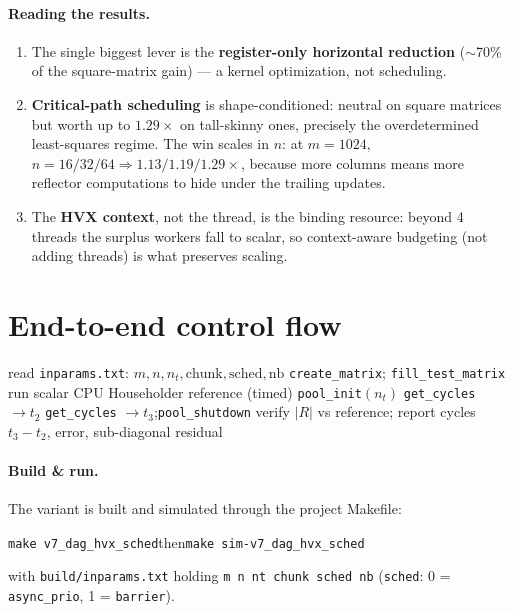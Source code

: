 \documentclass[11pt]{article}
\newcommand{\code}[1]{\texttt{\small #1}}
\begin{document}
\paragraph{Reading the results.}
\begin{enumerate}\itemsep1pt
\item The single biggest lever is the \textbf{register-only horizontal reduction}
($\sim$70\% of the square-matrix gain) --- a kernel optimization, not scheduling.
\item \textbf{Critical-path scheduling} is shape-conditioned: neutral on square
matrices but worth up to $1.29\times$ on tall-skinny ones, precisely the
overdetermined least-squares regime. The win scales in $n$: at $m{=}1024$,
$n{=}16/32/64 \Rightarrow 1.13/1.19/1.29\times$, because more columns means more
reflector computations to hide under the trailing updates.
\item The \textbf{HVX context}, not the thread, is the binding resource: beyond
4 threads the surplus workers fall to scalar, so context-aware budgeting (not adding
threads) is what preserves scaling.
\end{enumerate}

\section{End-to-end control flow}
\begin{algorithm}[H]
\caption{\code{main} (driver glue)}
read \code{inparams.txt}: $m,n,n_t,\text{chunk},\text{sched},\text{nb}$\;
\texttt{create\_matrix}; \texttt{fill\_test\_matrix}\;
run scalar CPU Householder reference (timed)\;
\texttt{pool\_init}$(n_t)$
\texttt{get\_cycles} $\to t_2$\;
\texttt{get\_cycles} $\to t_3$;\quad \texttt{pool\_shutdown}\;
verify $\lvert R\rvert$ vs reference; report cycles $t_3{-}t_2$, error, sub-diagonal residual\;
\end{algorithm}

\paragraph{Build \& run.} The variant is built and simulated through the project
Makefile:
\begin{center}
\code{make v7\_dag\_hvx\_sched}\quad then\quad \code{make sim-v7\_dag\_hvx\_sched}
\end{center}
with \code{build/inparams.txt} holding \code{m n nt chunk sched nb}
(\code{sched}: 0 = \code{async\_prio}, 1 = \code{barrier}).
\end{document}
